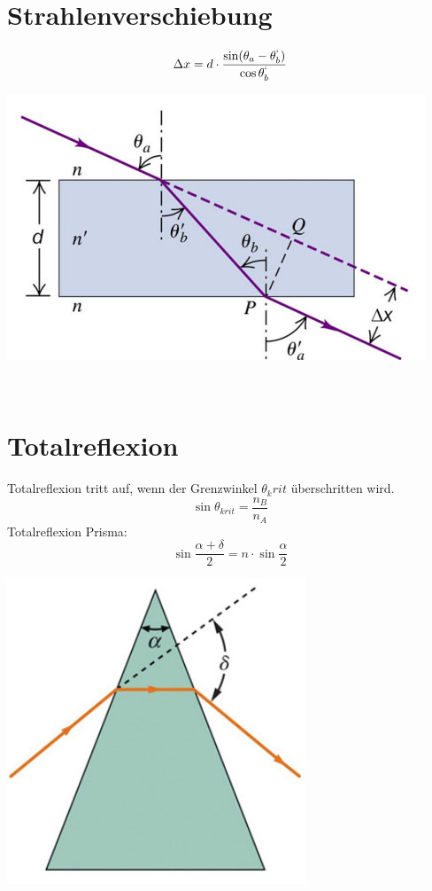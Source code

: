 \section{Strahlenverschiebung}
\[
	\Delta x = d \cdot \frac{ \sin (\theta_a -\theta_b ^`)}{\cos \theta_b ^`}
\]
\begin{center}
	\includegraphics[scale = 0.3]{images/strahlenverschiebung.jpg}
\end{center}
\

\section{Totalreflexion}
Totalreflexion tritt auf, wenn der Grenzwinkel $\theta_krit$ überschritten wird.
\[
	\sin \theta_{krit} = \frac{n_B}{n_A}
\]
Totalreflexion Prisma:
\[
	\sin\frac{\alpha+\delta}{2} = n\cdot \sin \frac{\alpha}{2}
\]
\begin{center}
	\includegraphics[scale = 0.2]{images/tr_prisma.jpg}
\end{center}
\
